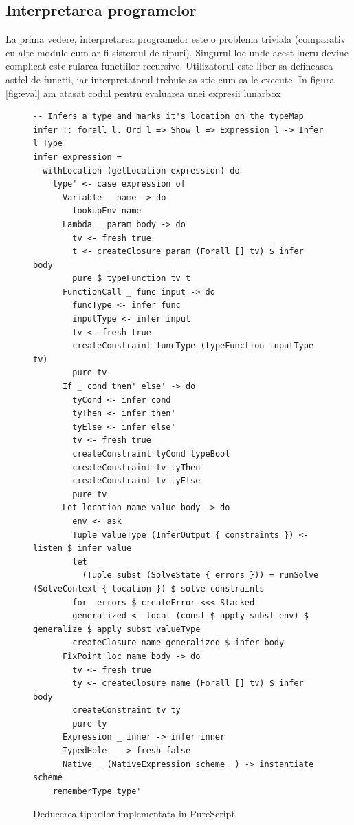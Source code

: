 \documentclass{article}
\begin{document}
\subsection{Interpretarea programelor}
La prima vedere, interpretarea programelor este o problema triviala (comparativ cu alte module cum ar fi sistemul de tipuri). Singurul loc unde acest lucru devine complicat este rularea functiilor recursive. Utilizatorul este liber sa defineasca astfel de functii, iar interpretatorul trebuie sa stie cum sa le execute. In figura \ref{fig:eval} am atasat codul pentru evaluarea unei expresii lunarbox


\begin{figure}[ht]
	\centering
	\begin{verbatim}
-- Infers a type and marks it's location on the typeMap
infer :: forall l. Ord l => Show l => Expression l -> Infer l Type
infer expression =
  withLocation (getLocation expression) do
    type' <- case expression of
      Variable _ name -> do
        lookupEnv name
      Lambda _ param body -> do
        tv <- fresh true
        t <- createClosure param (Forall [] tv) $ infer body
        pure $ typeFunction tv t
      FunctionCall _ func input -> do
        funcType <- infer func
        inputType <- infer input
        tv <- fresh true
        createConstraint funcType (typeFunction inputType tv)
        pure tv
      If _ cond then' else' -> do
        tyCond <- infer cond
        tyThen <- infer then'
        tyElse <- infer else'
        tv <- fresh true
        createConstraint tyCond typeBool
        createConstraint tv tyThen
        createConstraint tv tyElse
        pure tv
      Let location name value body -> do
        env <- ask
        Tuple valueType (InferOutput { constraints }) <- listen $ infer value
        let
          (Tuple subst (SolveState { errors })) = runSolve (SolveContext { location }) $ solve constraints
        for_ errors $ createError <<< Stacked
        generalized <- local (const $ apply subst env) $ generalize $ apply subst valueType
        createClosure name generalized $ infer body
      FixPoint loc name body -> do
        tv <- fresh true
        ty <- createClosure name (Forall [] tv) $ infer body
        createConstraint tv ty
        pure ty
      Expression _ inner -> infer inner
      TypedHole _ -> fresh false
      Native _ (NativeExpression scheme _) -> instantiate scheme
    rememberType type'
\end{verbatim}

	\caption{Deducerea tipurilor implementata in PureScript}
	\label{fig:infer}
\end{figure}
\end{document}
